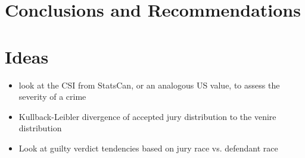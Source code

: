 \documentclass{article}
\begin{document}
\section{Conclusions and Recommendations} \label{sec:conclusion}

\section{Ideas}
\begin{itemize}
\item look at the CSI from StatsCan, or an analogous US value, to assess the severity of a crime
\item Kullback-Leibler divergence of accepted jury distribution to the venire distribution
\item Look at guilty verdict tendencies based on jury race vs. defendant race
\end{itemize}


 
\end{document}
